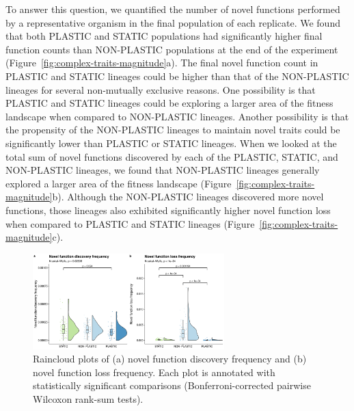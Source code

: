 \begin{raggedbottom}
To answer this question, we quantified the number of novel functions performed by a representative organism in the final population of each replicate.
We found that both PLASTIC and STATIC populations had significantly higher final function counts than NON-PLASTIC populations at the end of the experiment (Figure~\ref{fig:complex-traits-magnitude}a).
The final novel function count in PLASTIC and STATIC lineages could be higher than that of the NON-PLASTIC lineages for several non-mutually exclusive reasons.
One possibility is that PLASTIC and STATIC lineages could be exploring a larger area of the fitness landscape when compared to NON-PLASTIC lineages.
Another possibility is that the propensity of the NON-PLASTIC lineages to maintain novel traits could be significantly lower than PLASTIC or STATIC lineages.
When we looked at the total sum of novel functions discovered by each of the PLASTIC, STATIC, and NON-PLASTIC lineages, we found that NON-PLASTIC lineages generally explored a larger area of the fitness landscape (Figure~\ref{fig:complex-traits-magnitude}b).
Although the NON-PLASTIC lineages discovered more novel functions, those lineages also exhibited significantly higher novel function loss when compared to PLASTIC and STATIC lineages (Figure~\ref{fig:complex-traits-magnitude}c).

\begin{figure}[h!]
  \centering
  \includegraphics[width=0.66\textwidth]{02_consequences_of_plasticity/media/media-complex-traits-pace-panel.pdf}
  \caption{\small
  Raincloud plots of
  (a) novel function discovery frequency
  and (b) novel function loss frequency.
  Each plot is annotated with statistically significant comparisons (Bonferroni-corrected pairwise Wilcoxon rank-sum tests).
  }
  \label{fig:complex-traits-rate}
\end{figure}


\end{raggedbottom}
